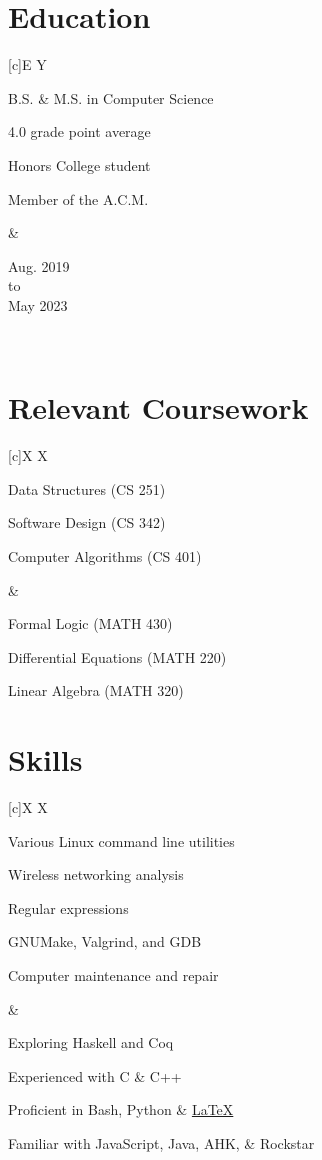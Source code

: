 \documentclass[10.5pt, letterpaper]{article}
\newenvironment{Education} %
{                          %
	\section*{Education}   %
	\flushleft             %
}{                         %
	\endflushleft          %
}
\newenvironment{Coursework}        %
{                                  %
	\section*{Relevant Coursework} %
	\flushleft                     %
	\tabularx{\textwidth}[c]{X X}  %
}{                                 %
	\endtabularx                   %
	\endflushleft                  %
}
\newenvironment{Skills}           %
{                                 %
	\section*{Skills}             %
	\flushleft                    %
	\tabularx{\textwidth}[c]{X X} %
}{                                %
	\endtabularx                  %
	\endflushleft                 %
}
\newenvironment{TitleDescription}[1]                    %
{                                                       %
	\begin{description}                                 %
		\item [#1]                                      %
		\let\realitem\item                              %
		\renewcommand{\item}[1]{\let\item\realitem ##1} %
}{                                                      %
	\end{description}                                   %
}
\newenvironment{EdEntry}[3]                 %
{                                           %
	\newcommand{\DateLine}{#2 \\ to \\ #3}  %
	\tabularx{\textwidth}[c]{E Y}           %
		\begin{multicols}{2}                %
			\begin{TitleDescription}{#1}    %
}{                                          %
			\end{TitleDescription}          %
		\end{multicols}                     %
		&                                   %
		\begin{center}\DateLine\end{center} %
		\\                                  %
	\endtabularx                            %
}
\begin{document}
\begin{Education}
	\begin{EdEntry}{University of Illinois at Chicago, Chicago, Il.}{Aug. 2019}{May 2023}
		\item B.S. \& M.S. in Computer Science 
		\item 4.0 grade point average
		\item Honors College student
		\item Member of the A.C.M.
	\end{EdEntry}
\end{Education}

\begin{Coursework}
		\begin{description}
			\item Data Structures (CS 251)
			\item Software Design (CS 342)
			\item Computer Algorithms (CS 401)
		\end{description} &
		\begin{description}
			\item Formal Logic (MATH 430)
			\item Differential Equations (MATH 220)
			\item Linear Algebra (MATH 320)
		\end{description}
\end{Coursework}

\begin{Skills}
	\begin{description}
		\item Various Linux command line utilities
		\item Wireless networking analysis
		\item Regular expressions
		\item GNUMake, Valgrind, and GDB
		\item Computer maintenance and repair	
	\end{description} 

	&

	\begin{TitleDescription}{Programming Languages}
		\item Exploring Haskell and Coq
		\item Experienced with C \& C++
		\item Proficient in Bash, Python \& \href{https://github.com/baricus/resume}{\LaTeX{}}
		\item Familiar with JavaScript, Java, AHK, \& Rockstar
	\end{TitleDescription} 
\end{Skills}
\end{document}
